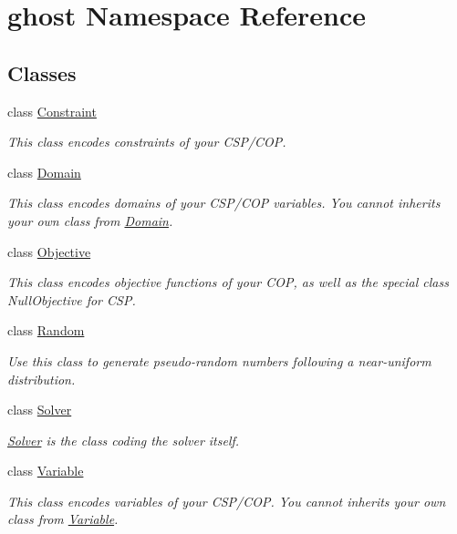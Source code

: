 \hypertarget{namespaceghost}{}\section{ghost Namespace Reference}
\label{namespaceghost}
\subsection*{Classes}
\begin{DoxyCompactItemize}
\item 
class \hyperlink{classghost_1_1Constraint}{Constraint}
\begin{DoxyCompactList}\small\item\em This class encodes constraints of your C\+S\+P/\+C\+OP. \end{DoxyCompactList}\item 
class \hyperlink{classghost_1_1Domain}{Domain}
\begin{DoxyCompactList}\small\item\em This class encodes domains of your C\+S\+P/\+C\+OP variables. You cannot inherits your own class from \hyperlink{classghost_1_1Domain}{Domain}. \end{DoxyCompactList}\item 
class \hyperlink{classghost_1_1Objective}{Objective}
\begin{DoxyCompactList}\small\item\em This class encodes objective functions of your C\+OP, as well as the special class Null\+Objective for C\+SP. \end{DoxyCompactList}\item 
class \hyperlink{classghost_1_1Random}{Random}
\begin{DoxyCompactList}\small\item\em Use this class to generate pseudo-\/random numbers following a near-\/uniform distribution. \end{DoxyCompactList}\item 
class \hyperlink{classghost_1_1Solver}{Solver}
\begin{DoxyCompactList}\small\item\em \hyperlink{classghost_1_1Solver}{Solver} is the class coding the solver itself. \end{DoxyCompactList}\item 
class \hyperlink{classghost_1_1Variable}{Variable}
\begin{DoxyCompactList}\small\item\em This class encodes variables of your C\+S\+P/\+C\+OP. You cannot inherits your own class from \hyperlink{classghost_1_1Variable}{Variable}. \end{DoxyCompactList}\end{DoxyCompactItemize}
